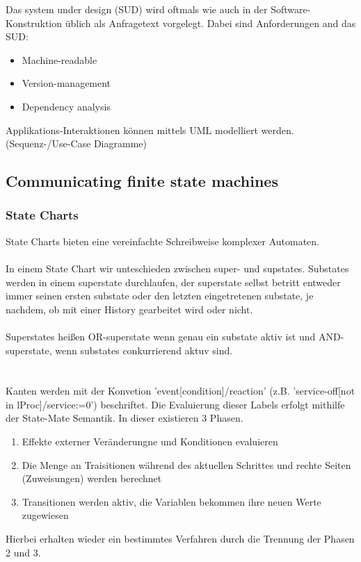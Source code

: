 Das system under design (SUD) wird oftmals wie auch in der Software-Konstruktion üblich als Anfragetext
vorgelegt.
Dabei sind Anforderungen and das SUD:
\begin{itemize}
    \item Machine-readable
    \item Version-management
    \item Dependency analysis
\end{itemize}
Applikations-Interaktionen können mittels UML modelliert werden. (Sequenz-/Use-Case Diagramme)


\subsection{Communicating finite state machines}

\subsubsection{State Charts}
State Charts bieten eine vereinfachte Schreibweise komplexer Automaten.
\\ \\
In einem State Chart wir unteschieden zwischen super- und supstates.
Substates werden in einem superstate durchlaufen, der superstate selbst betritt entweder immer seinen
ersten substate oder den letzten eingetretenen substate, je nachdem, ob mit einer History gearbeitet wird
oder nicht.
\\ \\
Superstates heißen OR-superstate wenn genau ein substate aktiv ist und AND-superstate, wenn substates conkurrierend 
aktuv sind.
\\ \\
\\
Kanten werden mit der Konvetion 'event[condition]/reaction' (z.B. 'service-off[not in lProc]/service:=0') beschriftet.
Die Evaluierung dieser Labels erfolgt mithilfe der State-Mate Semantik.
In dieser existieren 3 Phasen.
\begin{enumerate}
    \item Effekte externer Veränderungne und Konditionen evaluieren
    \item Die Menge an Traisitionen während des aktuellen Schrittes und rechte Seiten (Zuweisungen) werden berechnet
    \item Transitionen werden aktiv, die Variablen bekommen ihre neuen Werte zugewiesen
\end{enumerate}
Hierbei erhalten wieder ein bestimmtes Verfahren durch die Trennung der Phasen 2 und 3.


